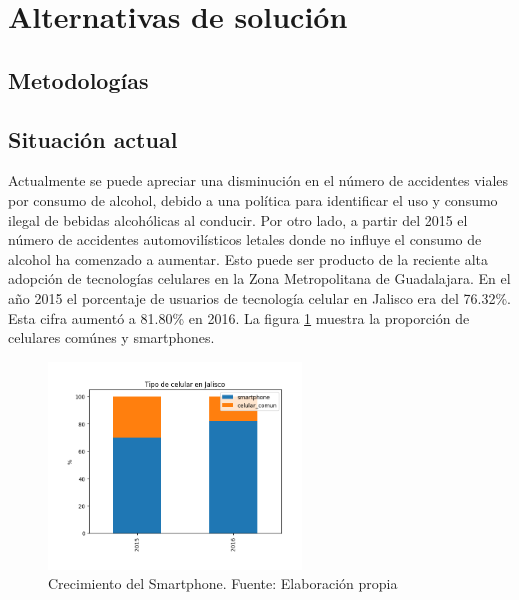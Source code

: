 \documentclass{article}
\begin{document}
\newpage

\section{Alternativas de solución}\label{sec:alternatives}

% 

\subsection{Metodologías}

\subsection{Situación actual}\label{subsec:actual}

Actualmente se puede apreciar una disminución en el número de accidentes viales por consumo de alcohol, debido a una política para identificar el uso y consumo ilegal de bebidas alcohólicas al conducir.
Por otro lado, a partir del 2015 el número de accidentes automovilísticos letales donde no influye el consumo de alcohol ha comenzado a aumentar. Esto puede ser producto de la reciente alta adopción de tecnologías celulares en la Zona Metropolitana de Guadalajara. En el año 2015 el porcentaje de usuarios de tecnología celular en Jalisco
era del 76.32\%. Esta cifra aumentó a 81.80\% en 2016. La figura \ref{fig:tipo_celular} muestra la
proporción de celulares comúnes y smartphones.


	\begin{figure}[H]\centering
	\includegraphics[width=0.6\textwidth]{resources/img/tipo_de_celular.png}
	\caption{\label{fig:tipo_celular} Crecimiento del Smartphone. Fuente: Elaboración propia}
    \end{figure}
\end{document}
